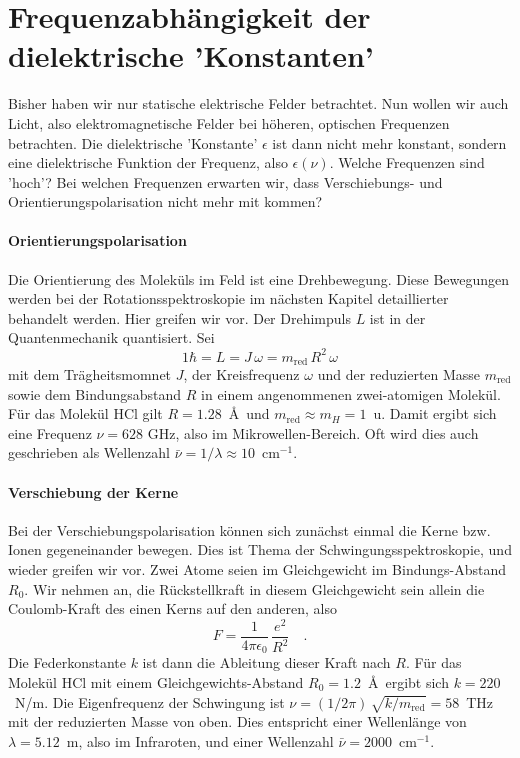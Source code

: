  
\section{Frequenzabhängigkeit der dielektrische 'Konstanten' }
 
Bisher haben wir nur statische elektrische Felder betrachtet. Nun wollen wir auch Licht, also elektromagnetische Felder bei  höheren, optischen Frequenzen  betrachten. Die dielektrische 'Konstante' $\epsilon$ ist dann nicht mehr konstant, sondern eine dielektrische Funktion der Frequenz, also $\epsilon(\nu)$. Welche Frequenzen sind 'hoch'? Bei welchen Frequenzen erwarten wir, dass Verschiebungs- und Orientierungspolarisation nicht mehr mit kommen?

\paragraph{Orientierungspolarisation} Die Orientierung des Moleküls im Feld ist eine Drehbewegung. Diese Bewegungen werden bei der Rotationsspektroskopie im nächsten Kapitel detaillierter behandelt werden. Hier greifen wir vor. Der Drehimpuls $L$ ist in der Quantenmechanik quantisiert. Sei
\begin{equation}
1 \hbar = L = J \, \omega = m_\text{red} \, R^2 \, \omega
\end{equation}
mit dem Trägheitsmomnet $J$, der Kreisfrequenz $\omega$ und der reduzierten Masse 
 $m_\text{red}$ sowie dem Bindungsabstand $R$ in einem angenommenen zwei-atomigen Molekül. Für das Molekül HCl gilt $R = 1.28$~\AA\ und $m_\text{red} \approx m_H = 1$~u. Damit ergibt sich eine Frequenz $\nu = 628$ GHz, also im Mikrowellen-Bereich. Oft wird dies auch geschrieben als Wellenzahl $\bar{\nu} = 1 /\lambda \approx 10$~cm$^{-1}$.
 
\paragraph{Verschiebung der Kerne} Bei der Verschiebungspolarisation können sich zunächst einmal die Kerne bzw. Ionen gegeneinander bewegen. Dies ist Thema der Schwingungsspektroskopie, und wieder greifen wir vor. Zwei Atome seien im Gleichgewicht  im Bindungs-Abstand $R_0$. Wir nehmen an, die Rückstellkraft in diesem Gleichgewicht sein allein die Coulomb-Kraft des einen Kerns auf den anderen, also 
\begin{equation}
F = \frac{1}{4 \pi \epsilon_0} \, \frac{e^2}{R^2} \quad .
\end{equation}
Die Federkonstante $k$ ist dann die Ableitung dieser Kraft nach $R$. Für das Molekül HCl mit einem Gleichgewichts-Abstand $R_0 = 1.2$~\AA\ ergibt sich $k = 220$~N/m. Die Eigenfrequenz der Schwingung  ist $\nu = (1/2\pi) \, \sqrt{k/m_\text{red}} = 58$~THz mit der reduzierten Masse von oben. Dies entspricht einer Wellenlänge von $\lambda = 5.12$~\textmu m, also im Infraroten, und einer Wellenzahl $\bar{\nu} = 2000$~cm$^{-1}$.

